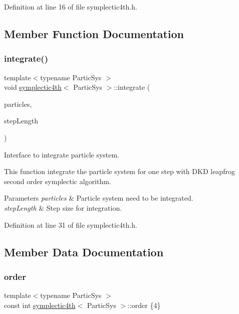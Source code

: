 Definition at line 16 of file symplectic4th.\+h.



\subsection{Member Function Documentation}
\mbox{\label{classsymplectic4th_a4ec2375bddd7b3cdff6c675e14a08fe0}} 
\subsubsection{\texorpdfstring{integrate()}{integrate()}}
{\footnotesize\ttfamily template$<$typename Partic\+Sys $>$ \\
void \mbox{\hyperlink{classsymplectic4th}{symplectic4th}}$<$ Partic\+Sys $>$\+::integrate (\begin{DoxyParamCaption}\item[{Partic\+Sys \&}]{particles,  }\item[{\mbox{\hyperlink{classsymplectic4th_a272a5a2bb16a90a7ebdad0335a2fac9b}{Scalar}}}]{step\+Length }\end{DoxyParamCaption})}



Interface to integrate particle system. 

This function integrate the particle system for one step with D\+KD leapfrog second order symplectic algorithm. 
\begin{DoxyParams}{Parameters}
{\em particles} & Particle system need to be integrated. \\
\hline
{\em step\+Length} & Step size for integration. \\
\hline
\end{DoxyParams}


Definition at line 31 of file symplectic4th.\+h.



\subsection{Member Data Documentation}
\mbox{\label{classsymplectic4th_a44427b7e9dab1a2241071d1cc639ebe4}} 
\subsubsection{\texorpdfstring{order}{order}}
{\footnotesize\ttfamily template$<$typename Partic\+Sys $>$ \\
const int \mbox{\hyperlink{classsymplectic4th}{symplectic4th}}$<$ Partic\+Sys $>$\+::order \{4\}\hspace{0.3cm}{\ttfamily [static]}}



